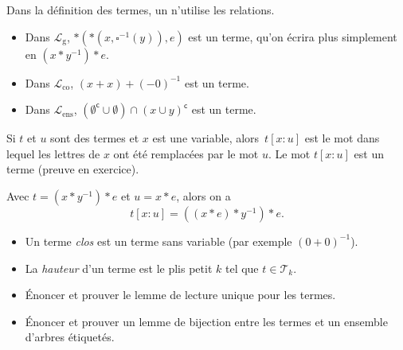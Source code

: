 \documentclass[./main]{subfiles}
\begin{document}
  \begin{rmk}
    Dans la définition des termes, un n'utilise les relations.
  \end{rmk}

  \begin{exm}
    \begin{itemize}
      \item Dans $\mathcal{L}_\mathrm{g}$, $*(*(x,\square^{-1}(y)), e)$ est un terme, qu'on écrira plus simplement en $(x * y^{-1}) * e$.
      \item Dans $\mathcal{L}_\mathrm{co}$, $(x + x) + (-0)^{-1}$ est un terme.
      \item Dans $\mathcal{L}_\mathrm{ens}$, $(\emptyset^\mathsf{c} \cup \emptyset) \cap (x \cup y)^\mathsf{c}$ est un terme.
    \end{itemize}
  \end{exm}

  \begin{defn}
    Si $t$ et $u$ sont des termes et $x$ est une variable, alors~$t[x:u]$ est le mot dans lequel les lettres de  $x$ ont été remplacées par le mot $u$.
    Le mot $t[x:u]$ est un terme (preuve en exercice).
  \end{defn}

  \begin{exm}
    Avec $t = (x * y^{-1}) * e$ et $u = x * e$, alors on a \[
      t[x:u] = ((x*e) * y^{-1}) * e
    .\]
  \end{exm}

  \begin{defn}
    \begin{itemize}
      \item Un terme \textit{clos} est un terme sans variable (par exemple $(0 + 0)^{-1}$).
      \item La \textit{hauteur} d'un terme est le plis petit $k$ tel que $t \in \mathcal{T}_k$.
    \end{itemize}
  \end{defn}

  \begin{exo}
    \begin{itemize}
      \item Énoncer et prouver le lemme de lecture unique pour les termes.
      \item Énoncer et prouver un lemme de bijection entre les termes et un ensemble d'arbres étiquetés.
    \end{itemize}
  \end{exo}
\end{document}
